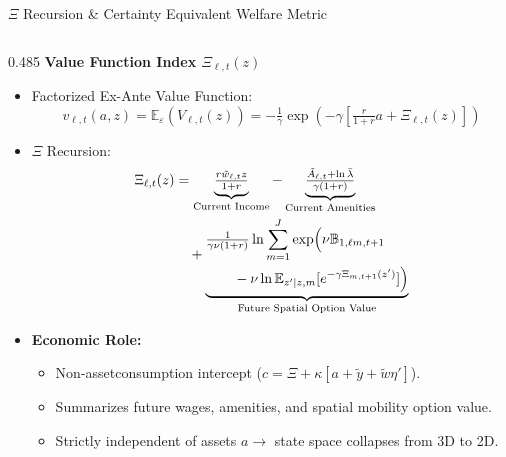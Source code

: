 \documentclass[aspectratio=169, 10pt]{beamer}
\begin{document}
\begin{frame}{$\Xi$ Recursion \& Certainty Equivalent Welfare Metric \label{backup:xi_ce_metric}}
    \begin{columns}[T]
        \begin{column}{0.485\textwidth}
            \textbf{\small Value Function Index $\Xi_{\ell,t}(z)$}
            \vspace{0.04cm}
            \begin{itemize}\scriptsize\setlength{\itemsep}{2pt}
                \item Factorized Ex-Ante Value Function:
                $$v_{\ell,t}(a, z) = \mathbb{E}_\varepsilon(V_{\ell,t}(z)) = -\tfrac{1}{\gamma} \exp\left( -\gamma \left[ \tfrac{r}{1+r} a + \Xi_{\ell,t}(z) \right] \right)$$
                \item $\Xi$ Recursion:
                {\tiny
                \begin{align*}
\Xi_{\ell,t}(z) &= \underbrace{\tfrac{r \tilde{w}_{\ell,t} z}{1+r}}_{\text{Current Income}} - \underbrace{\tfrac{\tilde{A}_{\ell,t} + \ln \bar{\lambda}}{\gamma(1+r)}}_{\text{Current Amenities}} \\
&\quad + \underbrace{\begin{aligned}
    &\tfrac{1}{\gamma\nu(1+r)} \ln \sum_{m=1}^J \exp\Bigl( \nu \mathbb{B}_{1,\ell m, t+1} \\
    &\qquad - \nu \ln \mathbb{E}_{z'|z,m}[e^{-\gamma \Xi_{m,t+1}(z')}] \Bigr)
\end{aligned}}_{\text{Future Spatial Option Value}}
\end{align*}
                }
                \item \textbf{Economic Role:}
                \begin{itemize}\tiny
                    \item Non-assetconsumption intercept ($c = \Xi + \kappa[a + \tilde{y} + \tilde{w}\eta']$).
                    \item Summarizes future wages, amenities, and spatial mobility option value.
                    \item Strictly independent of assets $a \to$ state space collapses from 3D to 2D.
                \end{itemize}
            \end{itemize}
        \end{column}
        

\end{columns}
\end{frame}
\end{document}
